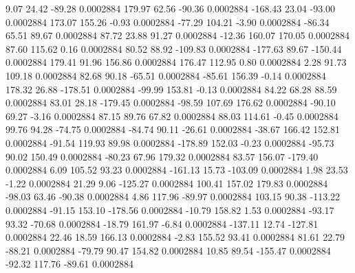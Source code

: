         9.07       24.42      -89.28     0.0002884
      179.97       62.56      -90.36     0.0002884
     -168.43       23.04      -93.00     0.0002884
      173.07      155.26       -0.93     0.0002884
      -77.29      104.21       -3.90     0.0002884
      -86.34       65.51       89.67     0.0002884
       87.72       23.88       91.27     0.0002884
      -12.36      160.07      170.05     0.0002884
       87.60      115.62        0.16     0.0002884
       80.52       88.92     -109.83     0.0002884
     -177.63       89.67     -150.44     0.0002884
      179.41       91.96      156.86     0.0002884
      176.47      112.95        0.80     0.0002884
        2.28       91.73      109.18     0.0002884
       82.68       90.18      -65.51     0.0002884
      -85.61      156.39       -0.14     0.0002884
      178.32       26.88     -178.51     0.0002884
      -99.99      153.81       -0.13     0.0002884
       84.22       68.28       88.59     0.0002884
       83.01       28.18     -179.45     0.0002884
      -98.59      107.69      176.62     0.0002884
      -90.10       69.27       -3.16     0.0002884
       87.15       89.76       67.82     0.0002884
       88.03      114.61       -0.45     0.0002884
       99.76       94.28      -74.75     0.0002884
      -84.74       90.11      -26.61     0.0002884
      -38.67      166.42      152.81     0.0002884
      -91.54      119.93       89.98     0.0002884
     -178.89      152.03       -0.23     0.0002884
      -95.73       90.02      150.49     0.0002884
      -80.23       67.96      179.32     0.0002884
       83.57      156.07     -179.40     0.0002884
        6.09      105.52       93.23     0.0002884
     -161.13       15.73     -103.09     0.0002884
        1.98       23.53       -1.22     0.0002884
       21.29        9.06     -125.27     0.0002884
      100.41      157.02      179.83     0.0002884
      -98.03       63.46      -90.38     0.0002884
        4.86      117.96      -89.97     0.0002884
      103.15       90.38     -113.22     0.0002884
      -91.15      153.10     -178.56     0.0002884
      -10.79      158.82        1.53     0.0002884
      -93.17       93.32      -70.68     0.0002884
      -18.79      161.97       -6.84     0.0002884
     -137.11       12.74     -127.81     0.0002884
       22.46       18.59      166.13     0.0002884
       -2.83      155.52       93.41     0.0002884
       81.61       22.79      -88.21     0.0002884
      -79.79       90.47      154.82     0.0002884
       10.85       89.54     -155.47     0.0002884
      -92.32      117.76      -89.61     0.0002884
